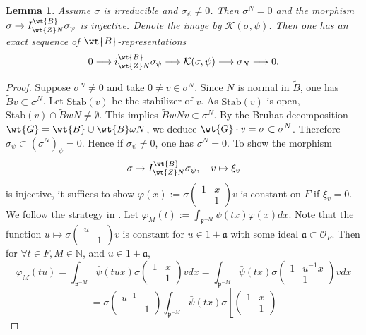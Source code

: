 \documentclass[11pt,reqno]{amsart}
\newcommand{\CK}{{\mathcal {K}}} \newcommand{\CL}{{\mathcal {L}}}
\newcommand{\Stab}{{\mathrm{Stab}}}\newcommand{\Symb}{{\mathrm{Symb}}}
\newcommand{\lra}{\longrightarrow}\newcommand{\lla}{\longleftarrow}
\theoremstyle{plain}
\newtheorem{lem}[thm]{Lemma}  \newtheorem{prop}[thm]{Proposition}
\theoremstyle{remark} \newtheorem{remark}[thm]{Remark}
\theoremstyle{definition} \newtheorem{exercise}[thm]{Exercise}
\theoremstyle{definition} \newtheorem{example}[thm]{Example} \newtheorem{condition}[thm]{Condition}
\numberwithin{equation}{section}
\renewcommand{\-}{\text{--}}
\begin{document}
 \begin{lem}\label{Kiri}Assume $\sigma$ is irreducible and $\sigma_\psi\neq0$. Then $\sigma^N=0$ and 
 the morphism $\sigma\to I_{\wt{Z}N}^{\wt{B}}\sigma_\psi$
is injective. Denote the image by $\CK(\sigma,\psi)$. Then one has an exact sequence of $\wt{B}$-representations
$$0\lra i_{\wt{Z}N}^{\wt{B}}\sigma_\psi\lra\CK(\sigma,\psi)\lra \sigma_N\lra 0.$$
\end{lem}
\begin{proof}Suppose $\sigma^N\neq 0$ and take $0\neq v\in \sigma^N$. Since $N$ is normal in $\tilde{B}$, one has  $\tilde{B}v\subset \sigma^N$. Let $\Stab(v)$ be the stabilizer of $v$. As $\Stab(v)$ is open, $\Stab(v)\cap \tilde{B}wN\neq\emptyset$. This implies  $\tilde{B}wN v\subset \sigma^N$.  By the Bruhat decomposition $\wt{G}=\wt{B}\cup \wt{B}\omega N$, we deduce  $\wt{G}\cdot v=\sigma\subset \sigma^N$.  Therefore $\sigma_\psi\subset (\sigma^N)_\psi=0$. Hence if $\sigma_\psi\neq0$, one has $\sigma^N=0$. To show the morphism \[\sigma\to I_{\wt{Z}N}^{\wt{B}}\sigma_\psi,\quad v\mapsto\xi_v\] is injective,  it suffices to show   $\varphi(x):=\sigma\begin{pmatrix} 1 & x \\ & 1 
\end{pmatrix}v$ is constant on $F$ if $\xi_v=0$. We follow the strategy in \cite[Theorem 3.1]{PR01}. 
 Let $\varphi_M(t):=\int_{\mathfrak{p}^{-M}}\bar{\psi}(tx)\varphi(x)dx$. Note that the function $u\mapsto \sigma\begin{pmatrix}
    u & \\
    & 1
\end{pmatrix}v$ is constant for $u\in 1+\mathfrak{a}$ with some ideal $\mathfrak{a}\subset \mathcal{O}_F$. Then for $\forall t\in F, M\in \mathbb{N}$, and $u\in 1+\mathfrak{a}$,
$$\varphi_M(tu)=\int_{\mathfrak{p}^{-M}}\bar{\psi}(tux)\sigma\begin{pmatrix} 1 & x\\ & 1
\end{pmatrix}v dx=\int_{\mathfrak{p}^{-M}}\bar{\psi}(tx)\sigma\begin{pmatrix}1 & u^{-1}x\\ & 1
\end{pmatrix}v dx$$
$$=\sigma\begin{pmatrix} u^{-1} & \\  & 1
\end{pmatrix}\int_{\mathfrak{p}^{-M}}\bar{\psi}(tx)\sigma\left[\begin{pmatrix}1 & x\\ & 1

\end{pmatrix}$$
\end{proof}
\end{document}

